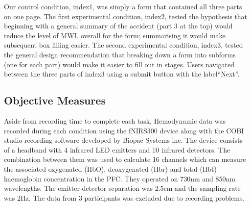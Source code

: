 \documentclass[../main/Feedback.tex]{subfiles}
\begin{document}
Our control condition, index1, was simply a form that contained all three parts on one page. 
The first experimental condition, index2, tested the hypothesis that beginning with a general summary of the accident (part 3 at the top) would reduce the level of MWL overall for the form; summarising it would make subsequent box filling easier.
The second experimental condition, index3, tested the general design recommendation that breaking down a form into subforms (one for each part) would make it easier to fill out in stages. %
Users navigated between the three parts of index3 using a submit button with the label``Next''.



\subsection{Objective Measures}
Aside from recording time to complete each task, Hemodynamic data was recorded during each condition using the fNIRS300 device along with the COBI studio recording software developed by Biopac Systems inc.
The device consists of a headband with 4 infrared LED emitters and 10 infrared detectors.
The combination between them was used to calculate 16 channels which can measure the associated oxygenated (HbO), deoxygenated (Hbr) and total (Hbt) haemoglobin concentration in the PFC.
They operated on 730nm and 850nm wavelengths.
The emitter-detector separation was 2.5cm and the sampling rate was 2Hz.
The data from 3 participants was excluded due to recording problems.
\end{document}
